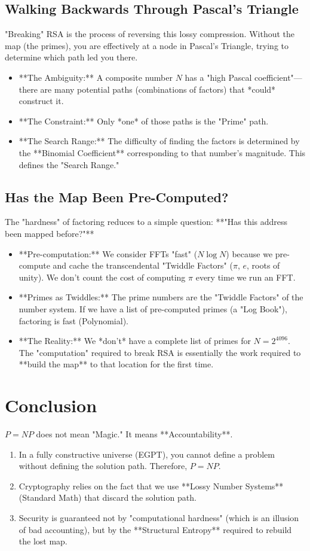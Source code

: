 \documentclass[11pt, a4paper]{article}
\begin{document}
\subsection{Walking Backwards Through Pascal's Triangle}
"Breaking" RSA is the process of reversing this lossy compression. Without the map (the primes), you are effectively at a node in Pascal's Triangle, trying to determine which path led you there.
\begin{itemize}
    \item **The Ambiguity:** A composite number $N$ has a "high Pascal coefficient"—there are many potential paths (combinations of factors) that *could* construct it.
    \item **The Constraint:** Only *one* of those paths is the "Prime" path.
    \item **The Search Range:** The difficulty of finding the factors is determined by the **Binomial Coefficient** corresponding to that number's magnitude. This defines the "Search Range."
\end{itemize}

\subsection{Has the Map Been Pre-Computed?}
The "hardness" of factoring reduces to a simple question: **"Has this address been mapped before?"**
\begin{itemize}
    \item **Pre-computation:** We consider FFTs "fast" ($N \log N$) because we pre-compute and cache the transcendental "Twiddle Factors" ($\pi$, $e$, roots of unity). We don't count the cost of computing $\pi$ every time we run an FFT.
    \item **Primes as Twiddles:** The prime numbers are the "Twiddle Factors" of the number system. If we have a list of pre-computed primes (a "Log Book"), factoring is fast (Polynomial).
    \item **The Reality:** We *don't* have a complete list of primes for $N=2^{4096}$. The "computation" required to break RSA is essentially the work required to **build the map** to that location for the first time.
\end{itemize}

\section{Conclusion}

$P=NP$ does not mean "Magic." It means **Accountability**.
\begin{enumerate}
    \item In a fully constructive universe (EGPT), you cannot define a problem without defining the solution path. Therefore, $P=NP$.
    \item Cryptography relies on the fact that we use **Lossy Number Systems** (Standard Math) that discard the solution path.
    \item Security is guaranteed not by "computational hardness" (which is an illusion of bad accounting), but by the **Structural Entropy** required to rebuild the lost map.
\end{enumerate}
\end{document}
